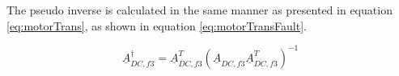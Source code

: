 
The pseudo inverse is calculated in the same manner as presented in equation \ref{eq:motorTrans}, as shown in equation \ref{eq:motorTransFault}. 

\begin{equation}
\label{eq:motorTransFault}
\underline{A}_{DC,f3}^\dagger   = \underline{A}_{DC,f3}^T  (\underline{A}_{DC,f3} \underline{A}_{DC,f3}^T)^{-1}
\end{equation}